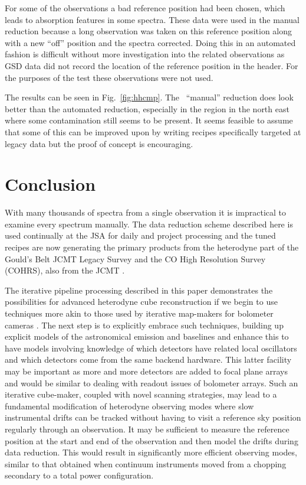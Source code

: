\documentclass[final,authoryear,5p,times,twocolumn]{elsarticle}
\begin{document}
For some of the observations a bad reference position had been chosen,
which leads to absorption features in some spectra. These data were
used in the manual reduction because a long observation was taken on
this reference position along with a new ``off'' position and the
spectra corrected. Doing this in an automated fashion is difficult
without more investigation into the related observations as GSD data
did not record the location of the reference position in the
header. For the purposes of the test these observations were not used.

The results can be seen in Fig.\ \ref{fig:hhcmp}. The \specx\ ``manual''
reduction does look better than the automated reduction, especially in
the region in the north east where some contamination still seems to
be present. It seems feasible to assume that some of this can be
improved upon by writing recipes specifically targeted at legacy data
but the proof of concept is encouraging.

\section{Conclusion}

With many thousands of spectra from a single observation it is
impractical to examine every spectrum manually. The data reduction
scheme described here is used continually at the JSA
\citep{2011ASPC..442..203E} for daily and project processing and the
tuned recipes are now generating the primary products from the
heterodyne part of the Gould's Belt JCMT Legacy Survey
\citep{2007PASP..119..855W} and the CO High Resolution Survey
(COHRS), also from the JCMT \citep{2013ApJS..209....8D}.

The iterative pipeline processing described in this paper demonstrates
the possibilities for advanced heterodyne cube reconstruction if we
begin to use techniques more akin to those used by iterative
map-makers for bolometer cameras
\citep[e.g.][]{2013MNRAS.430.2545C}. The next step is to explicitly
embrace such techniques, building up explicit models of the
astronomical emission and baselines and enhance this to have models
involving knowledge of which detectors have related local oscillators
and which detectors come from the same backend hardware. This latter
facility may be important as more and more detectors are added to
focal plane arrays and would be similar to dealing with readout issues
of bolometer arrays. Such an iterative cube-maker, coupled with novel
scanning strategies, may lead to a fundamental modification of
heterodyne observing modes where slow instrumental drifts can be
tracked without having to visit a reference sky position regularly
through an observation. It may be sufficient to measure the reference
position at the start and end of the observation and then model the
drifts during data reduction. This would result in significantly more
efficient observing modes, similar to that obtained when continuum
instruments moved from a chopping secondary to a total power
configuration.
\end{document}
